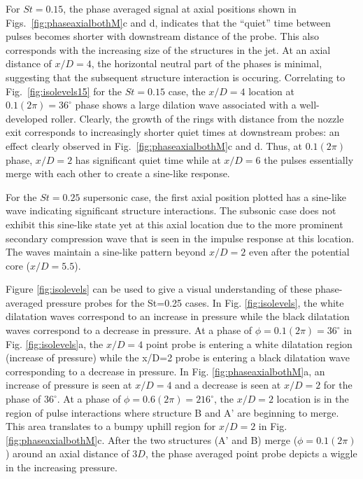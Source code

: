 \documentclass[english]{aiaa-tc}
\begin{document}
For $St=0.15$, the phase averaged signal at axial positions shown in
Figs.~\ref{fig:phaseaxialbothM}c and d, indicates that the ``quiet'' time between
pulses becomes shorter with downstream distance of the probe.  This
also corresponds with the increasing size of the structures in the jet. At an
axial distance of $x/D=4$, the horizontal neutral part of the phases
is minimal, suggesting that the subsequent structure interaction is occuring.  Correlating to
Fig.~\ref{fig:isolevels15} for the $St=0.15$ case, the $x/D=4$ location at
$0.1(2\pi)=36^\circ$ phase shows a large dilation wave associated with
a well-developed roller. Clearly, the growth of the rings with
distance from the nozzle exit corresponds to increasingly shorter
quiet times at downstream probes: an effect clearly observed in
Fig.~\ref{fig:phaseaxialbothM}c and d.  Thus, at $0.1(2\pi)$ phase, $x/D=2$ has
significant quiet time while at $x/D=6$ the pulses essentially merge
with each other to create a sine-like response.

For the $St=0.25$ supersonic case, the first axial position plotted has a sine-like wave indicating significant structure interactions. The subsonic case does not exhibit this sine-like state yet at this axial location due to the more prominent secondary compression wave that is seen in the impulse response at this location. The waves maintain a sine-like pattern beyond $x/D=2$ even after the potential core ($x/D=5.5$).

Figure \ref{fig:isolevels} can be used to give a visual understanding of these phase-averaged pressure probes for the St=0.25 cases. In Fig. \ref{fig:isolevels}, the white dilatation waves correspond to an increase in pressure while the black dilatation waves correspond to a decrease in pressure. At a phase of $\phi=0.1(2\pi)=36^\circ$ in Fig. \ref{fig:isolevels}a, the $x/D=4$ point probe is entering a white dilatation region (increase of pressure) while the x/D=2 probe is entering a black dilatation wave corresponding to a decrease in pressure. In Fig. \ref{fig:phaseaxialbothM}a, an increase of pressure is seen at $x/D=4$ and a decrease is seen at $x/D=2$ for the phase of $36^\circ$. At a phase of $\phi=0.6(2\pi)=216^\circ$, the $x/D=2$ location is in the region of pulse interactions where structure B and A' are beginning to merge. This area translates to a bumpy uphill region for $x/D=2$ in Fig. \ref{fig:phaseaxialbothM}c. After the two structures (A' and B) merge ($\phi=0.1(2\pi)$) around an axial distance of $3D$, the phase averaged point probe depicts a wiggle in the increasing pressure.
\end{document}
